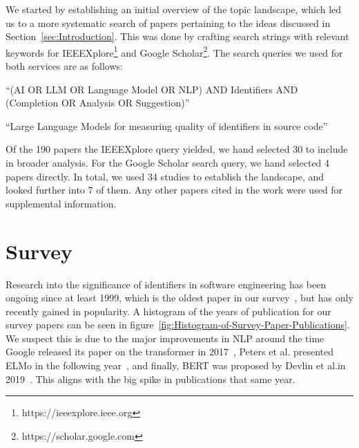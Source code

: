 \documentclass[conference]{IEEEtran}
\begin{document}
We started by establishing an initial overview of the topic landscape, which led us to a
more systematic search of papers pertaining to the ideas discussed in
Section~\ref{sec:Introduction}. This was done by crafting search strings with relevant
keywords for IEEEXplore\footnote{https://ieeexplore.ieee.org} and Google
Scholar\footnote{https://scholar.google.com}. The search queries we used for both services
are as follows:

\begin{description}
    \item[IEEEXplore:]

    \enquote{(AI OR LLM OR Language Model OR NLP) AND Identifiers AND %
             (Completion OR Analysis OR Suggestion)}

    \item[Google Scholar:]

    \enquote{Large Language Models for measuring quality of identifiers in source code}
\end{description}

Of the 190 papers the IEEEXplore query yielded, we hand selected 30 to include in broader
analysis. For the Google Scholar search query, we hand selected 4 papers directly. In
total, we used 34 studies to establish the landscape, and looked further into 7 of them.
Any other papers cited in the work were used for supplemental information.


\section{Survey}
\label{sec:Survey}

Research into the significance of identifiers in software engineering has been ongoing
since at least 1999, which is the oldest paper in our survey~\cite{Antoniol1999OO}, but
has only recently gained in popularity. A histogram of the years of publication for our
survey papers can be seen in figure~\ref{fig:Histogram-of-Survey-Paper-Publications}. We
suspect this is due to the major improvements in \ac{NLP} around the time Google released
its paper on the transformer in 2017~\cite{Vaswani2017Transformer}, Peters et al.\@
presented ELMo in the following year~\cite{Peters2018DeepCW}, and finally, BERT was
proposed by Devlin et al.\@ in 2019~\cite{Devlin2019BERT}. This aligns with the big spike
in publications that same year.
\end{document}
